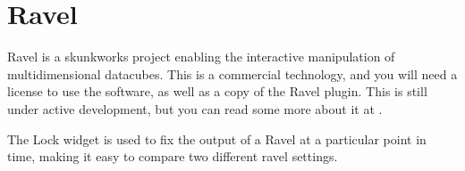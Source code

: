 \section{Ravel}\label{Ravel}\label{Lock}

Ravel is a skunkworks project enabling the interactive manipulation of
multidimensional datacubes. This is a commercial technology, and you
will need a license to use the software, as well as a copy of the
Ravel plugin. This is still under active development, but you can read
some more about it at
.

The Lock widget is used to fix the output of a Ravel at a particular
point in time, making it easy to compare two different ravel settings.

